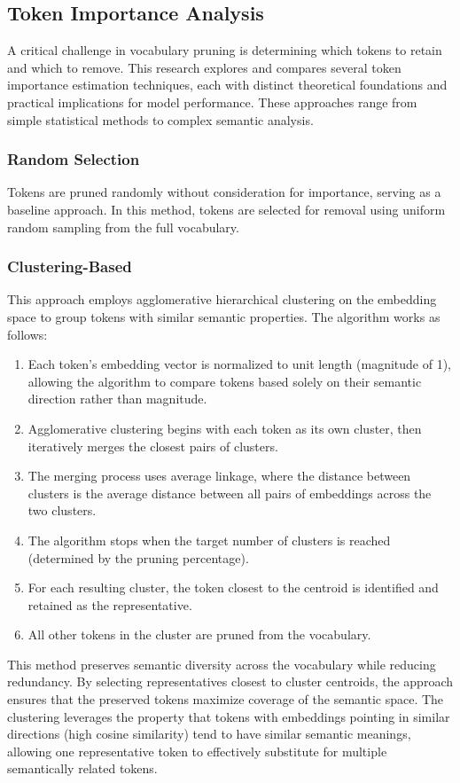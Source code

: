\documentclass[twocolumn]{article}
\begin{document}
\subsection{Token Importance Analysis}
A critical challenge in vocabulary pruning is determining which tokens to retain and which to remove. This research explores and compares several token importance estimation techniques, each with distinct theoretical foundations and practical implications for model performance. These approaches range from simple statistical methods to complex semantic analysis.

\subsubsection{Random Selection}
Tokens are pruned randomly without consideration for importance, serving as a baseline approach. In this method, tokens are selected for removal using uniform random sampling from the full vocabulary.

\subsubsection{Clustering-Based}
This approach employs agglomerative hierarchical clustering on the embedding space to group tokens with similar semantic properties. The algorithm works as follows:

\begin{enumerate}
    \item Each token's embedding vector is normalized to unit length (magnitude of 1), allowing the algorithm to compare tokens based solely on their semantic direction rather than magnitude.
    \item Agglomerative clustering begins with each token as its own cluster, then iteratively merges the closest pairs of clusters.
    \item The merging process uses average linkage, where the distance between clusters is the average distance between all pairs of embeddings across the two clusters.
    \item The algorithm stops when the target number of clusters is reached (determined by the pruning percentage).
    \item For each resulting cluster, the token closest to the centroid is identified and retained as the representative.
    \item All other tokens in the cluster are pruned from the vocabulary.
\end{enumerate}
This method preserves semantic diversity across the vocabulary while reducing redundancy. By selecting representatives closest to cluster centroids, the approach ensures that the preserved tokens maximize coverage of the semantic space. The clustering leverages the property that tokens with embeddings pointing in similar directions (high cosine similarity) tend to have similar semantic meanings, allowing one representative token to effectively substitute for multiple semantically related tokens.
\end{document}
